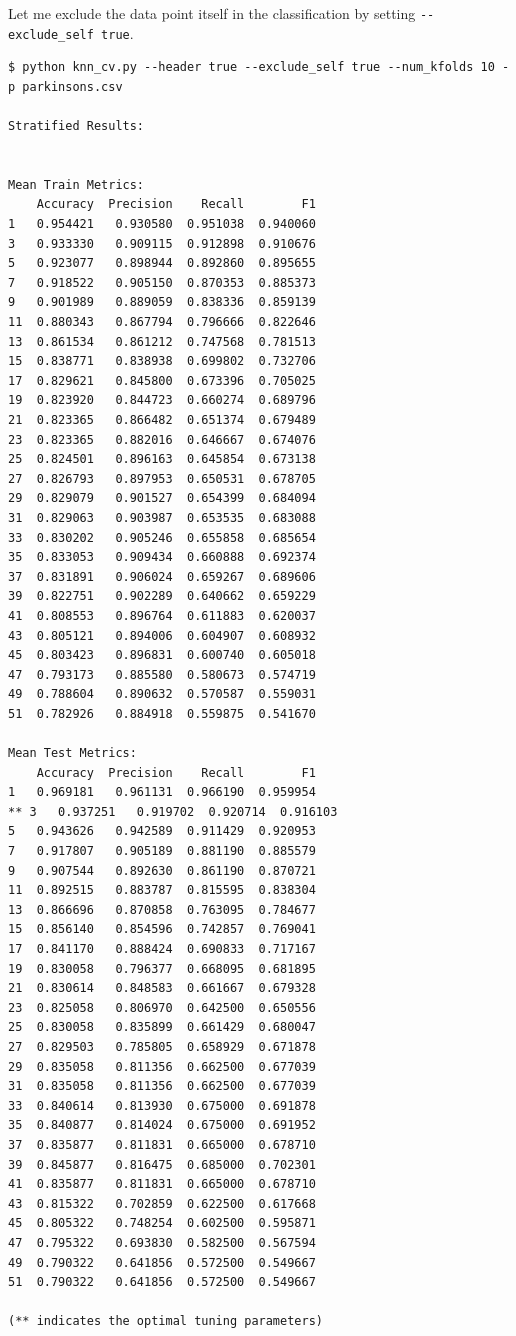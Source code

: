 Let me exclude the data point itself in the classification by setting \verb|--exclude_self true|.


\begin{verbatim}
$ python knn_cv.py --header true --exclude_self true --num_kfolds 10 -p parkinsons.csv

Stratified Results:


Mean Train Metrics: 
    Accuracy  Precision    Recall        F1
1   0.954421   0.930580  0.951038  0.940060
3   0.933330   0.909115  0.912898  0.910676
5   0.923077   0.898944  0.892860  0.895655
7   0.918522   0.905150  0.870353  0.885373
9   0.901989   0.889059  0.838336  0.859139
11  0.880343   0.867794  0.796666  0.822646
13  0.861534   0.861212  0.747568  0.781513
15  0.838771   0.838938  0.699802  0.732706
17  0.829621   0.845800  0.673396  0.705025
19  0.823920   0.844723  0.660274  0.689796
21  0.823365   0.866482  0.651374  0.679489
23  0.823365   0.882016  0.646667  0.674076
25  0.824501   0.896163  0.645854  0.673138
27  0.826793   0.897953  0.650531  0.678705
29  0.829079   0.901527  0.654399  0.684094
31  0.829063   0.903987  0.653535  0.683088
33  0.830202   0.905246  0.655858  0.685654
35  0.833053   0.909434  0.660888  0.692374
37  0.831891   0.906024  0.659267  0.689606
39  0.822751   0.902289  0.640662  0.659229
41  0.808553   0.896764  0.611883  0.620037
43  0.805121   0.894006  0.604907  0.608932
45  0.803423   0.896831  0.600740  0.605018
47  0.793173   0.885580  0.580673  0.574719
49  0.788604   0.890632  0.570587  0.559031
51  0.782926   0.884918  0.559875  0.541670

Mean Test Metrics: 
    Accuracy  Precision    Recall        F1
1   0.969181   0.961131  0.966190  0.959954
** 3   0.937251   0.919702  0.920714  0.916103
5   0.943626   0.942589  0.911429  0.920953
7   0.917807   0.905189  0.881190  0.885579
9   0.907544   0.892630  0.861190  0.870721
11  0.892515   0.883787  0.815595  0.838304
13  0.866696   0.870858  0.763095  0.784677
15  0.856140   0.854596  0.742857  0.769041
17  0.841170   0.888424  0.690833  0.717167
19  0.830058   0.796377  0.668095  0.681895
21  0.830614   0.848583  0.661667  0.679328
23  0.825058   0.806970  0.642500  0.650556
25  0.830058   0.835899  0.661429  0.680047
27  0.829503   0.785805  0.658929  0.671878
29  0.835058   0.811356  0.662500  0.677039
31  0.835058   0.811356  0.662500  0.677039
33  0.840614   0.813930  0.675000  0.691878
35  0.840877   0.814024  0.675000  0.691952
37  0.835877   0.811831  0.665000  0.678710
39  0.845877   0.816475  0.685000  0.702301
41  0.835877   0.811831  0.665000  0.678710
43  0.815322   0.702859  0.622500  0.617668
45  0.805322   0.748254  0.602500  0.595871
47  0.795322   0.693830  0.582500  0.567594
49  0.790322   0.641856  0.572500  0.549667
51  0.790322   0.641856  0.572500  0.549667

(** indicates the optimal tuning parameters)
\end{verbatim}

